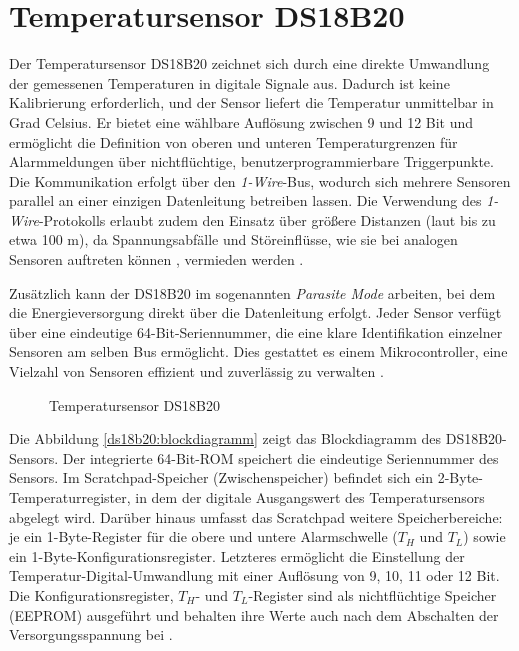 \section{Temperatursensor DS18B20}
Der Temperatursensor DS18B20 zeichnet sich durch eine direkte Umwandlung der gemessenen Temperaturen in digitale Signale aus. Dadurch ist keine Kalibrierung erforderlich, und der Sensor liefert die Temperatur unmittelbar in Grad Celsius. Er bietet eine wählbare Auflösung zwischen 9 und 12 Bit und ermöglicht die Definition von oberen und unteren Temperaturgrenzen für Alarmmeldungen über nichtflüchtige, benutzerprogrammierbare Triggerpunkte. Die Kommunikation erfolgt über den \textit{1-Wire}-Bus, wodurch sich mehrere Sensoren parallel an einer einzigen Datenleitung betreiben lassen. Die Verwendung des \textit{1-Wire}-Protokolls erlaubt zudem den Einsatz über grö{\ss}ere Distanzen (laut \cite{Navarrete:2025} bis zu etwa 100 m), da Spannungsabfälle und Störeinflüsse, wie sie bei analogen Sensoren auftreten können \cite{Richelli:2015}, vermieden werden \cite{Maxim:2019}.

Zusätzlich kann der DS18B20 im sogenannten \textit{Parasite Mode} arbeiten, bei dem die Energieversorgung direkt über die Datenleitung erfolgt. Jeder Sensor verfügt über eine eindeutige 64-Bit-Seriennummer, die eine klare Identifikation einzelner Sensoren am selben Bus ermöglicht. Dies gestattet es einem Mikrocontroller, eine Vielzahl von Sensoren effizient und zuverlässig zu verwalten \cite{Fezari:2019} \cite[3]{Elyounsi:2021}. 

	\begin{figure}[H]
		\centering
		\caption{Temperatursensor DS18B20}
		\label{fig:ds18b20-pinout}
	\end{figure}
	
	
Die Abbildung \ref{ds18b20:blockdiagramm} zeigt das Blockdiagramm des DS18B20-Sensors. Der integrierte 64-Bit-ROM speichert die eindeutige Seriennummer des Sensors. Im Scratchpad-Speicher (Zwischenspeicher) befindet sich ein 2-Byte-Temperaturregister, in dem der digitale Ausgangswert des Temperatursensors abgelegt wird. Darüber hinaus umfasst das Scratchpad weitere Speicherbereiche: je ein 1-Byte-Register für die obere und untere Alarmschwelle ($T_H$ und $T_L$) sowie ein 1-Byte-Konfigurationsregister. Letzteres ermöglicht die Einstellung der Temperatur-Digital-Umwandlung mit einer Auflösung von 9, 10, 11 oder 12 Bit. Die Konfigurationsregister, $T_H$- und $T_L$-Register sind als nichtflüchtige Speicher (EEPROM) ausgeführt und behalten ihre Werte auch nach dem Abschalten der Versorgungsspannung bei \cite{Maxim:2019}.

